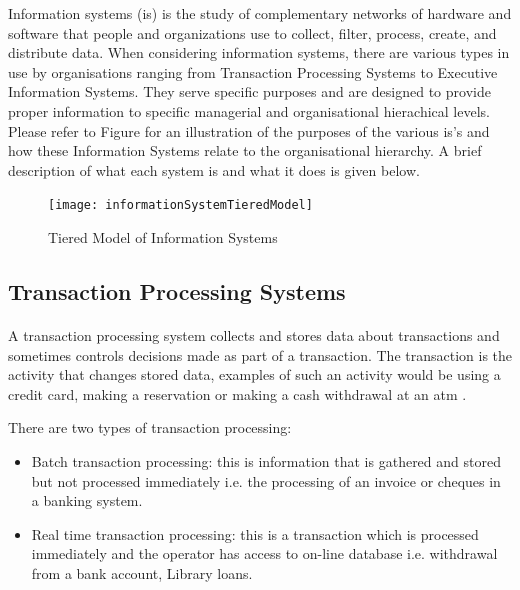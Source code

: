 Information systems (\acrshort{is}) is the study of complementary networks of hardware and software that people and organizations use to collect, filter, process, create, and distribute data\cite{Denning1999}. When considering information systems, there are various types in use by organisations ranging from Transaction Processing Systems to Executive Information Systems. They serve specific purposes and are designed to provide proper information to specific managerial and organisational hierachical levels. Please refer to Figure for an illustration of the purposes of the various \acrshort{is}'s and how these Information Systems relate to the organisational hierarchy. A brief description of what each system is and what it does is given below.

\begin{figure}[H]
\centering
\texttt{[image: informationSystemTieredModel]}
\caption[Tiered Model of Information Systems]{Tiered Model of Information Systems \cite{Laudon1988}}
\label{image-informationSystemTieredModel}
\end{figure}

\subsection{Transaction Processing Systems}

\paragraph{} A transaction processing system collects and stores data about transactions and sometimes controls decisions made as part of a transaction. The transaction is the activity that changes stored data, examples of such an activity would be using a credit card, making a reservation or making a cash withdrawal at an \acrshort{atm} \cite{NSWHSC2013}.

There are two types of transaction processing:

\begin{itemize}
\item Batch transaction processing: this is information that is gathered and stored but not processed immediately i.e. the processing of an invoice or cheques in a banking system.
\item Real time transaction processing: this is a transaction which is processed immediately and the operator has access to on-line database i.e. withdrawal from a bank account, Library loans.
\end{itemize}

